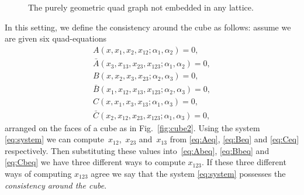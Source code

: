 \documentclass[pdftex]{sigma}
\numberwithin{equation}{section}
\begin{document}
\begin{figure}[bthp] \centering
 \caption{The purely geometric quad graph not embedded in any lattice.}\label{fig:geomquad}
\end{figure}

In this setting, we def\/ine the consistency around the cube as follows: assume we are given six quad-equations
\begin{subequations} \label{eq:system}
 \begin{gather}
 A(x,x_{1},x_{2},x_{12};\alpha_1, \alpha_2) =0, \label{eq:Aeq} \\
 \bar{A}(x_{3},x_{13},x_{23},x_{123};\alpha_1, \alpha_2) =0, \label{eq:Abeq} \\
 B(x,x_{2},x_{3},x_{23};\alpha_2, \alpha_3) =0, \label{eq:Beq} \\
 \bar{B}(x_{1},x_{12},x_{13},x_{123};\alpha_2, \alpha_3)=0, \label{eq:Bbeq} \\
 C(x,x_{1},x_{3},x_{13};\alpha_1, \alpha_3) =0, \label{eq:Ceq} \\
 \bar{C}(x_{2},x_{12},x_{23},x_{123};\alpha_1, \alpha_3) =0, \label{eq:Cbeq}
 \end{gather}
\end{subequations}
arranged on the faces of a cube as in Fig.~\ref{fig:cube2}. Using the system \eqref{eq:system} we can compute~$x_{12}$,~$x_{23}$ and~$x_{13}$ from \eqref{eq:Aeq}, \eqref{eq:Beq} and \eqref{eq:Ceq} respectively. Then substituting these values into~\eqref{eq:Abeq}, \eqref{eq:Bbeq} and \eqref{eq:Cbeq} we have three dif\/ferent ways to compute $x_{123}$. If these three dif\/ferent ways of computing $x_{123}$ agree we say that the system \eqref{eq:system} possesses the \emph{consistency around the cube}.
\end{document}
